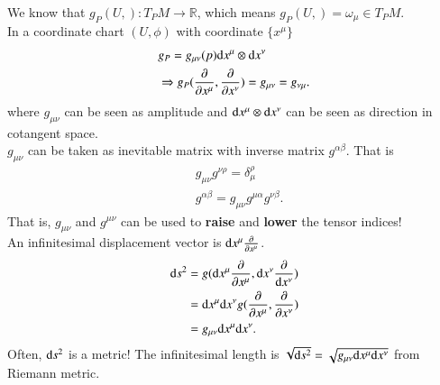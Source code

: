 \documentclass[openany,10pt]{book}
\theoremstyle{definition}
\theoremstyle{definition}
\theoremstyle{remark}
\begin{document}
    We know that $g_P(U, ):T_PM\to\mathbb{R}$, which means $g_P(U, )=\omega_\mu\in T_PM$.\\
    In a coordinate chart $(U,\phi)$ with coordinate $\{x^\mu\}$ 
    \begin{equation}
        \begin{aligned}
          &g_P=g_{\mu\nu}(p){\rm{d}}x^\mu\otimes{\rm{d}}x^\nu\\
          &\Rightarrow g_P(\frac{\partial}{\partial x^\mu},\frac{\partial}{\partial x^\nu})=g_{\mu\nu}=g_{\nu\mu}.
        \end{aligned}
    \end{equation}
    where $g_{\mu\nu}$ can be seen as amplitude and ${\rm{d}}x^\mu\otimes{\rm{d}}x^\nu$ can be seen as direction in cotangent space.\\
    $g_{\mu\nu}$ can be taken as inevitable matrix with inverse matrix $g^{\alpha\beta}$. That is 
    \begin{equation}
        \begin{aligned}
          &g_{\mu\nu}g^{\nu\rho}=\delta^\rho_\mu\\
          &g^{\alpha\beta}=g_{\mu\nu}g^{\mu\alpha}g^{\nu\beta}.
        \end{aligned}
    \end{equation}
    That is, $g_{\mu\nu}$ and $g^{\mu\nu}$ can be used to \textbf{raise} and \textbf{lower} the tensor indices!\\
    An infinitesimal displacement vector is ${\rm{d}}x^\mu\frac{\partial}{\partial x^\mu}$.
\begin{equation}
    \begin{aligned}
        {\rm{d}}s^2&=g({\rm{d}}x^\mu\frac{\partial}{\partial x^\mu},{\rm{d}}x^\nu\frac{\partial}{{\rm{d}}x^\nu})\\
        &={\rm{d}}x^\mu{\rm{d}}x^\nu g(\frac{\partial}{\partial x^\mu},\frac{\partial}{\partial x^\nu})\\
        &=g_{\mu\nu}{\rm{d}}x^\mu{\rm{d}}x^\nu.
    \end{aligned}
\end{equation}
Often, ${\rm{d}}s^2$ is a metric! The infinitesimal length is $\sqrt{{\rm{d}}s^2}=\sqrt{g_{\mu\nu}{\rm{d}}x^\mu{\rm{d}}x^\nu}$ from Riemann metric.
\end{document}
